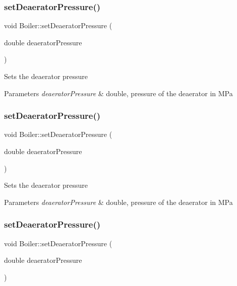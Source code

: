 \subsubsection{\texorpdfstring{set\+Deaerator\+Pressure()}{setDeaeratorPressure()}\hspace{0.1cm}{\footnotesize\ttfamily [1/3]}}
{\footnotesize\ttfamily void Boiler\+::set\+Deaerator\+Pressure (\begin{DoxyParamCaption}\item[{double}]{deaerator\+Pressure }\end{DoxyParamCaption})}

Sets the deaerator pressure 
\begin{DoxyParams}{Parameters}
{\em deaerator\+Pressure} & double, pressure of the deaerator in M\+Pa \\
\hline
\end{DoxyParams}
\mbox{\label{class_boiler_a56f422254606ebba1248ae0b4f8f0215}} 
\subsubsection{\texorpdfstring{set\+Deaerator\+Pressure()}{setDeaeratorPressure()}\hspace{0.1cm}{\footnotesize\ttfamily [2/3]}}
{\footnotesize\ttfamily void Boiler\+::set\+Deaerator\+Pressure (\begin{DoxyParamCaption}\item[{double}]{deaerator\+Pressure }\end{DoxyParamCaption})}

Sets the deaerator pressure 
\begin{DoxyParams}{Parameters}
{\em deaerator\+Pressure} & double, pressure of the deaerator in M\+Pa \\
\hline
\end{DoxyParams}
\mbox{\label{class_boiler_a56f422254606ebba1248ae0b4f8f0215}} 
\subsubsection{\texorpdfstring{set\+Deaerator\+Pressure()}{setDeaeratorPressure()}\hspace{0.1cm}{\footnotesize\ttfamily [3/3]}}
{\footnotesize\ttfamily void Boiler\+::set\+Deaerator\+Pressure (\begin{DoxyParamCaption}\item[{double}]{deaerator\+Pressure }\end{DoxyParamCaption})}

